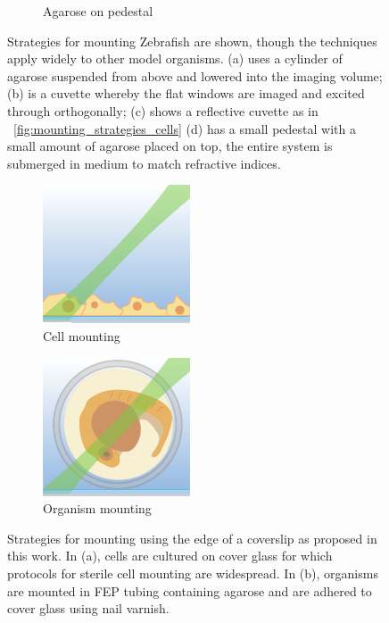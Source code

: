 \begin{figure}
\begin{subfigure}[b]{0.4\linewidth}
         \caption{Agarose on pedestal}
    \end{subfigure}
    \caption{Strategies for mounting Zebrafish are shown, though the techniques apply widely to other model organisms.
    (a) uses a cylinder of agarose suspended from above and lowered into the imaging volume;
    (b) is a cuvette whereby the flat windows are imaged and excited through orthogonally;
    (c) shows a reflective cuvette as in \figurename~\ref{fig:mounting_strategies_cells}
    (d) has a small pedestal with a small amount of agarose placed on top, the entire system is submerged in medium to match refractive indices.}
    \label{fig:mounting_strategies_fish_cartoon}
\end{figure}

\begin{figure}
    \centering
    \begin{subfigure}[t]{0.4\linewidth}
         \centering
        \includegraphics{edge_mount/cells}
         \caption{Cell mounting}\label{fig:edge_mount/cells}
    \end{subfigure}
    \begin{subfigure}[t]{0.4\linewidth}
             \centering
        \includegraphics{edge_mount/fish}
         \caption{Organism mounting}\label{fig:edge_mount/fish}
    \end{subfigure}
    \caption[Strategies for mounting using the edge of a coverslip]{Strategies for mounting using the edge of a coverslip as proposed in this work.
    In (a), cells are cultured on cover glass for which protocols for sterile cell mounting are widespread.
    In (b), organisms are mounted in \gls{FEP} tubing containing agarose and are adhered to cover glass using nail varnish.
    }
    \label{fig:edge_mount}
\end{figure}

